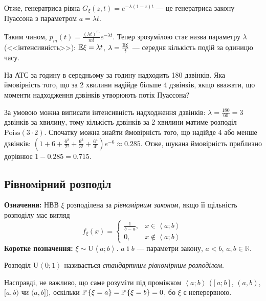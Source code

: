 Отже, генератриса рівна $G_\xi(z, t) = e^{-\lambda(1-z)t}$ --- це генератриса закону Пуассона з параметром $a=\lambda t$.

Таким чином, $p_m(t) = \frac{(\lambda t)^m}{m!}e^{-\lambda t}$. 
Тепер зрозумілою стає назва параметру $\lambda$ (<<інтенсивність>>): $\E\xi = \lambda t$, $\lambda = \frac{\E\xi}{t}$ --- середня кількість подій за одиницю часу.

\begin{example}
    На АТС за годину в середньому за годину надходить 180 дзвінків. Яка ймовірність того,
    що за 2 хвилини надійде більше 4 дзвінків, якщо вважати, що моменти надходження дзвінків
    утворюють потік Пуассона?

    За умовою можна виписати інтенсивність надходження дзвінків: $\lambda = \frac{180}{60} = 3$ дзвінків за хвилину,
    тому кількість дзвінків за 2 хвилини матиме розподіл $\mathrm{Poiss}(3\cdot 2)$.
    Спочатку можна знайти ймовірність того, що надійде 4 або менше дзвінків:
    $\left(1 + 6 + \frac{6^2}{2!} + \frac{6^3}{3!} + \frac{6^4}{4!}\right)e^{-6} \approx 0.285$.
    Отже, шукана ймовірність приблизно дорівнює $1 - 0.285 = 0.715$.

\end{example}

\subsection{Рівномірний розподіл}
\noindent\textbf{Означення:}
    НВВ $\xi$ розподілена за \emph{рівномірним законом}, 
    якщо її щільність розподілу має вигляд \begin{equation}
        f_\xi(x) = \begin{cases}
            \frac{1}{b-a}, & x \in \left<a; b\right> \\
            0, & x \notin \left<a; b\right>
        \end{cases}
    \end{equation}
\textbf{Коротке позначення:} $\xi \sim \mathrm{U}\left<a; b\right>$.
    $a$ і $b$ --- параметри закону, $a<b$, $a, b \in \mathbb{R}$.

Розподіл $\mathrm{U}\left<0; 1\right>$ називається \emph{стандартним рівномірним розподілом}.

\begin{remark}
    Насправді, не важливо, що саме розуміти під проміжком $\left<a; b\right>$
    ($[a; b]$, $(a, b)$, $[a, b)$ чи $(a, b]$), оскільки $\P\left\{\xi = a \right\} = \P\left\{\xi = b \right\} = 0$,
    бо $\xi$ є неперервною.
\end{remark}

